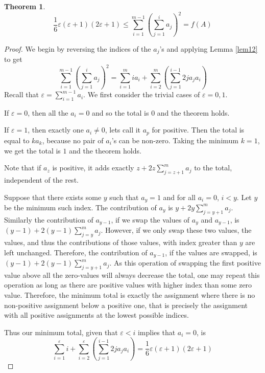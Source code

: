 \documentclass[12pt]{amsart}
\newtheorem{theorem}{Theorem}
\begin{document}
\begin{theorem}
\label{lem13}
	$$\frac{1}{6} \varepsilon (\varepsilon + 1) (2 \varepsilon+ 1) \leq \sum_{i=1}^{m-1} \left( \sum_{j=1}^{i} a_j \right)^2 = f(A)$$
\end{theorem}
\begin{proof}
	We begin by reversing the indices of the $a_j$'s and applying Lemma \ref{lem12} to get
	$$\sum_{i=1}^{m-1} \left( \sum_{j=1}^{i} a_j \right)^2 = \sum_{i=1}^{m} i a_i  + \sum_{i=2}^{m} \left( \sum_{j=1}^{i-1} 2 j a_j a_i \right)$$
	Recall that $\varepsilon = \sum_{i=1}^{m-1} a_i$.
	We first consider the trivial cases of $\varepsilon = 0, 1$.
	
		If $\varepsilon = 0$, then all the $a_i = 0$ and so the total is $0$ and the theorem holds.

		If $\varepsilon = 1$, then exactly one $a_i \neq 0$, lets call it $a_p$ for positive. 
		Then the total is equal to $k a_k$, because no pair of $a_i$'s can be non-zero. 
		Taking the minimum $k = 1$, we get the total is $1$ and the theorem holds.

	Note that if $a_z$ is positive, it adds exactly $z + 2 z \sum_{j=z+1}^{m} a_j$ to the total, independent of the rest.
		
	Suppose that there exists some $y$ such that $a_y = 1$ and for all $a_i = 0$, $i < y$. Let $y$ be the minimum such index. 
		The contribution of $a_y$ is $y + 2 y \sum_{j=y+1}^{m} a_j$. Similarly the contribution of $a_{y-1}$, if we swap the values of $a_y$ and $a_{y-1}$, is $(y-1) + 2 (y-1) \sum_{j=y}^{m} a_j$. However, if we only swap these two values, the values, and thus the contributions of those values, with index greater than $y$ are left unchanged. 
		Therefore, the contribution of $a_{y-1}$, if the values are swapped, is \\ $(y-1) + 2 (y-1) \sum_{j=y+1}^{m} a_j$.
		As this operation of swapping the first positive value above all the zero-values will always decrease the total, one may repeat this operation as long as there are positive values with higher index than some zero value.
		Therefore, the minimum total is exactly the assignment where there is no non-positive assignment below a positive one, that is precisely the assignment with all positive assignments at the lowest possible indices.

	Thus our minimum total, given that $\varepsilon < i$ implies that $a_i = 0$, is
	$$\sum_{i=1}^{\varepsilon} i + \sum_{i=2}^{\varepsilon} \left( \sum_{j=1}^{i-1} 2 j a_j a_i \right) = \frac{1}{6} \varepsilon (\varepsilon + 1) (2 \varepsilon+ 1)$$
\end{proof}
\end{document}
